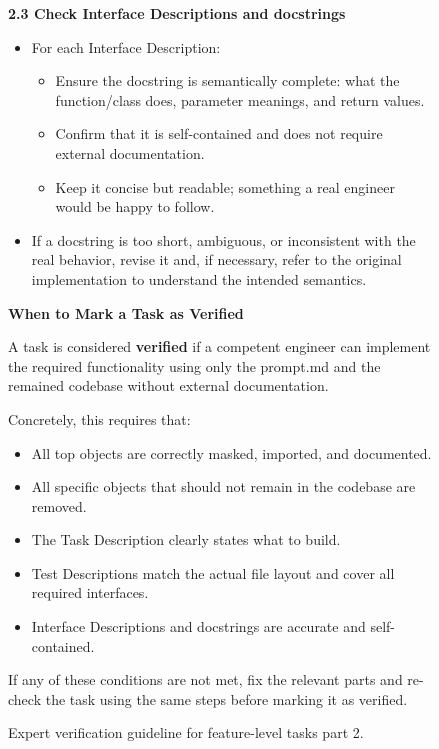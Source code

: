 \documentclass{article}
\begin{document}
\begin{figure}[t]
\begin{tcolorbox}
\textbf{2.3 Check Interface Descriptions and docstrings}
\begin{itemize}
    \item For each Interface Description:
    \begin{itemize}
        \item Ensure the docstring is semantically complete: what the function/class does, parameter
        meanings, and return values.
        \item Confirm that it is self-contained and does not require external documentation.
        \item Keep it concise but readable; something a real engineer would be happy to follow.
    \end{itemize}
    \item If a docstring is too short, ambiguous, or inconsistent with the real behavior,
    revise it and, if necessary, refer to the original implementation to understand the intended semantics.
\end{itemize}

\vspace{4pt}
\textbf{When to Mark a Task as Verified}

A task is considered \textbf{verified} if a competent engineer can implement the required functionality
using only the prompt.md and the remained codebase without external documentation.


Concretely, this requires that:
\begin{itemize}
    \item All top objects are correctly masked, imported, and documented.
    \item All specific objects that should not remain in the codebase are removed.
    \item The Task Description clearly states what to build.
    \item Test Descriptions match the actual file layout and cover all required interfaces.
    \item Interface Descriptions and docstrings are accurate and self-contained.
\end{itemize}

If any of these conditions are not met, fix the relevant parts
and re-check the task using the same steps before marking it as verified.

\end{tcolorbox}
\caption{Expert verification guideline for feature-level tasks part 2.}
\label{fig:feature_verification_guideline_part2}
\end{figure}
\end{document}

